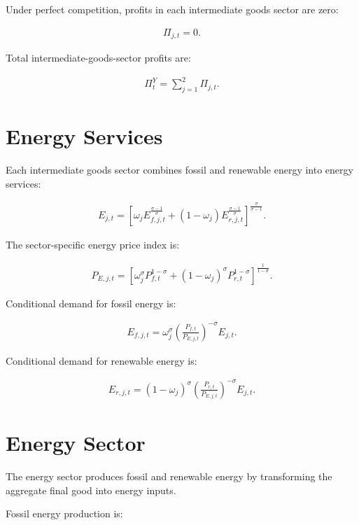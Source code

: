 \documentclass[12pt]{article}
\begin{document}
Under perfect competition, profits in each intermediate goods sector are zero:

\begin{align}
\Pi_{j,t}=0.
\end{align}

Total intermediate-goods-sector profits are:

\begin{align}
\Pi^Y_t
=
\sum_{j=1}^{2}\Pi_{j,t}.
\end{align}

\section{Energy Services}

Each intermediate goods sector combines fossil and renewable energy into energy services:

\begin{align}
E_{j,t}
=
\left[
\omega_j E_{f,j,t}^{\frac{\sigma-1}{\sigma}}
+
(1-\omega_j)E_{r,j,t}^{\frac{\sigma-1}{\sigma}}
\right]^{\frac{\sigma}{\sigma-1}}.
\end{align}

The sector-specific energy price index is:

\begin{align}
P_{E,j,t}
=
\left[
\omega_j^{\sigma}P_{f,t}^{1-\sigma}
+
(1-\omega_j)^{\sigma}P_{r,t}^{1-\sigma}
\right]^{\frac{1}{1-\sigma}}.
\end{align}

Conditional demand for fossil energy is:

\begin{align}
E_{f,j,t}
=
\omega_j^{\sigma}
\left(
\frac{P_{f,t}}{P_{E,j,t}}
\right)^{-\sigma}
E_{j,t}.
\end{align}

Conditional demand for renewable energy is:

\begin{align}
E_{r,j,t}
=
(1-\omega_j)^{\sigma}
\left(
\frac{P_{r,t}}{P_{E,j,t}}
\right)^{-\sigma}
E_{j,t}.
\end{align}

\section{Energy Sector}

The energy sector produces fossil and renewable energy by transforming the aggregate final good into energy inputs.

Fossil energy production is:
\end{document}
